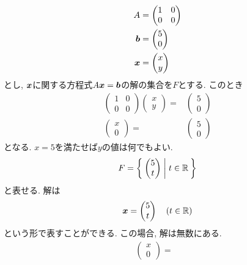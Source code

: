 \begin{example}
  \begin{align*}
    A&=\begin{pmatrix}1&0\\0&0\end{pmatrix}\\
    \boldsymbol{b}&=\begin{pmatrix}5\\0\end{pmatrix}\\
    \boldsymbol{x}&=\begin{pmatrix}x\\y\end{pmatrix}
  \end{align*}
  とし,
  $\boldsymbol{x}$に関する方程式$A\boldsymbol{x}=\boldsymbol{b}$の解の集合を$F$とする.
  このとき
  \begin{align*}
    \begin{pmatrix}1&0\\0&0\end{pmatrix}
      \begin{pmatrix}x\\y\end{pmatrix}=&
        \begin{pmatrix}5\\0\end{pmatrix}\\
          \begin{pmatrix}x\\0\end{pmatrix}=&
            \begin{pmatrix}5\\0\end{pmatrix}
  \end{align*}
  となる.
  $x=5$を満たせば$y$の値は何でもよい.
  \begin{align*}
    F=\Set{\begin{pmatrix}5\\t\end{pmatrix} | t\in \mathbb{R}}
  \end{align*}
  と表せる. 解は
  \begin{align*}
    \boldsymbol{x}=\begin{pmatrix}5\\t\end{pmatrix}\quad (t\in\mathbb{R})
  \end{align*}
  という形で表すことができる. 
  この場合, 解は無数にある.
  \begin{align*}
          \begin{pmatrix}x\\0\end{pmatrix}=&

\end{align*}
\end{example}
